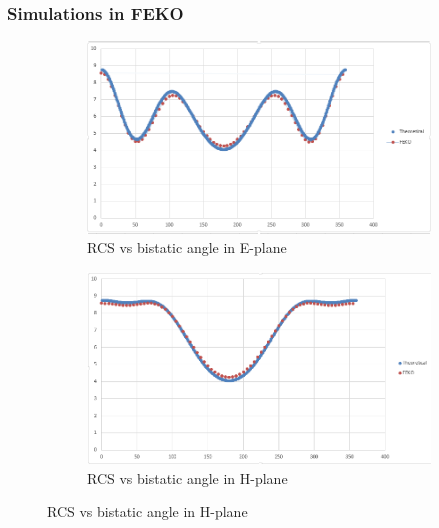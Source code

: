 \documentclass{beamer}
\begin{document}
\begin{frame}
\frametitle{Simulations in FEKO}
\begin{figure}[H]
\begin{subfigure}{0.48\textwidth}
\centering
\includegraphics[width = \linewidth]{eplane.PNG}
\caption{RCS vs bistatic angle in E-plane}
\end{subfigure}
\begin{subfigure}{0.48\textwidth}
\centering
\includegraphics[width = \linewidth]{hplane.PNG}
\caption{RCS vs bistatic angle in H-plane}
\end{subfigure}
\end{figure}
\end{frame}
\end{document}
